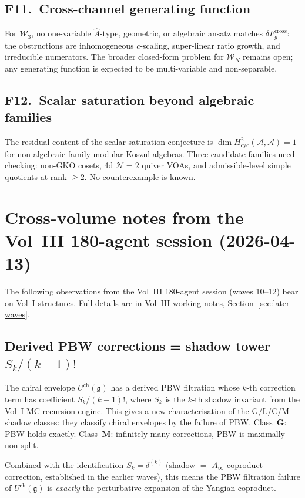 \documentclass[11pt]{article}
\newcommand{\cA}{\mathcal{A}}
\newcommand{\cN}{\mathcal{N}}
\newcommand{\cW}{\mathcal{W}}
\newcommand{\fg}{\mathfrak{g}}
\begin{document}
\subsection{F11.\ Cross-channel generating function}

For $\cW_3$, no one-variable $\hat{A}$-type, geometric, or
algebraic ansatz matches $\delta F_g^{\mathrm{cross}}$: the
obstructions are inhomogeneous $c$-scaling, super-linear ratio
growth, and irreducible numerators.  The broader closed-form
problem for $\cW_N$ remains open; any generating function is
expected to be multi-variable and non-separable.

\subsection{F12.\ Scalar saturation beyond algebraic families}

The residual content of the scalar saturation conjecture is
$\dim H^2_{\mathrm{cyc}}(\cA, \cA) = 1$ for
non-algebraic-family modular Koszul algebras.  Three candidate
families need checking: non-GKO cosets, 4d $\cN{=}2$ quiver VOAs,
and admissible-level simple quotients at rank $\geq 2$.
No counterexample is known.

\section{Cross-volume notes from the Vol~III 180-agent session (2026-04-13)}
\label{sec:vol3-cross-refs}

The following observations from the Vol~III 180-agent session
(waves 10--12) bear on Vol~I structures. Full details are in
Vol~III working notes, Section~\ref*{sec:later-waves}.

\subsection{Derived PBW corrections = shadow tower $S_k / (k-1)!$}

The chiral envelope $U^{\mathrm{ch}}(\fg)$ has a derived PBW
filtration whose $k$-th correction term has coefficient
$S_k / (k-1)!$, where $S_k$ is the $k$-th shadow invariant from
the Vol~I MC recursion engine. This gives a new characterisation
of the G/L/C/M shadow classes: they classify chiral envelopes by
the failure of PBW. Class~$\mathbf{G}$: PBW holds exactly.
Class~$\mathbf{M}$: infinitely many corrections, PBW is maximally
non-split.

Combined with the identification $S_k = \delta^{(k)}$
(shadow $=$ $A_\infty$ coproduct correction, established in the
earlier waves), this means the PBW filtration failure of
$U^{\mathrm{ch}}(\fg)$ is \emph{exactly} the perturbative
expansion of the Yangian coproduct.
\end{document}
